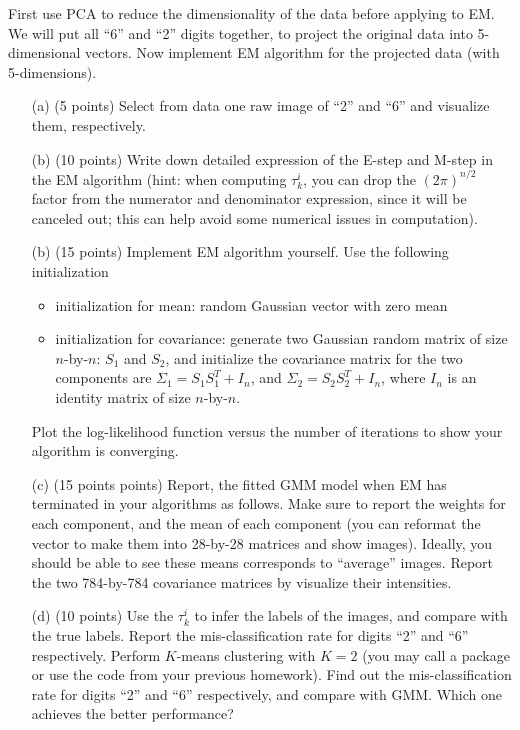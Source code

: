 \documentclass[twoside,12pt]{article}
\begin{document}
First use PCA to reduce the dimensionality of the data before applying to EM. We will put all ``6'' and ``2'' digits together, to project the original data into 5-dimensional vectors. Now implement EM algorithm for the projected data (with 5-dimensions). 
\begin{enumerate}

\item[(a)] (5 points) Select from data one raw image of ``2'' and ``6'' and visualize them, respectively. 

\item[(b)] (10 points) Write down detailed expression of the E-step and M-step in the EM algorithm (hint: when computing $\tau_k^i$, you can drop the $(2\pi)^{n/2}$ factor from the numerator and denominator expression, since it will be canceled out; this can help avoid some numerical issues in computation).

\item[(b)] (15 points) Implement EM algorithm yourself. Use the following initialization
\begin{itemize}
\item initialization for mean: random Gaussian vector with zero mean
\item initialization for covariance: generate two Gaussian random matrix of size $n$-by-$n$: $S_1$ and $S_2$, and initialize the covariance matrix for the two components are $\Sigma_1 = S_1 S_1^T + I_n$, and  $\Sigma_2 = S_2 S_2^T + I_n$, where $I_n$ is an identity matrix of size $n$-by-$n$. 
\end{itemize}
Plot the log-likelihood function versus the number of iterations to show your algorithm is converging.

\item[(c)] (15 points points) Report, the fitted GMM model when EM has terminated in your algorithms as follows. Make sure to report the weights for each component, and the mean of each component (you can reformat the vector to make them into 28-by-28 matrices and show images). Ideally, you should be able to see these means corresponds to ``average'' images.  Report the two 784-by-784 covariance matrices by visualize their intensities. 

\item[(d)] (10 points) Use the $\tau_{k}^i$ to infer the labels of the images, and compare with the true labels. Report the mis-classification rate for digits ``2'' and ``6'' respectively. Perform $K$-means clustering with $K=2$ (you may call a package or use the code from your previous homework). Find out the  mis-classification rate for digits ``2'' and ``6'' respectively, and compare with GMM. Which one achieves the better performance?

\end{enumerate}
\end{document}
